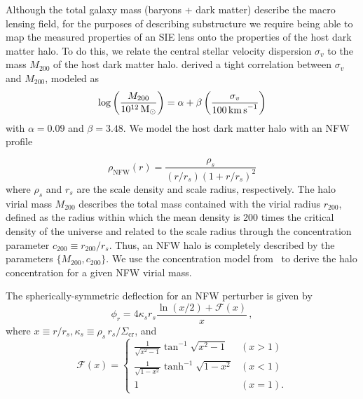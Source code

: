 \documentclass[twocolumn]{aastex63}
\begin{document}
Although the total galaxy mass (baryons + dark matter) describe the macro lensing field, for the purposes of describing substructure we require being able to map the measured properties of an SIE lens onto the properties of the host dark matter halo. To do this, we relate the central stellar velocity dispersion $\sigma_v$ to the mass $M_{200}$ of the host dark matter halo. \citet{2018ApJ...859...96Z} derived a tight correlation between $\sigma_v$ and $M_{200}$, modeled as
\begin{equation}
\log\left(\frac{M_{200}}{10^{12}\,\Msun}\right) = \alpha + \beta\left(\frac{\sigma_v}{100\,\kmps}\right)
\label{eq:sigma_v_M_200_relation}
\end{equation}
with $\alpha = 0.09$ and $\beta = 3.48$.
We model the host dark matter halo with an NFW profile~\citep{1996ApJ...462..563N,1997ApJ...490..493N}

\begin{equation}
\rho_\mathrm{NFW}(r)=\frac{\rho_{s}}{\left(r / r_{s}\right)\left(1+r / r_{s}\right)^{2}}
\label{eq:rhoNFW}
\end{equation}
where $\rho_s$ and $r_s$ are the scale density and scale radius, respectively. The halo virial mass $M_{200}$ describes the total mass contained with the virial radius $r_{200}$, defined as the radius within which the mean density is 200 times the critical density of the universe and related to the scale radius through the concentration parameter $c_{200} \equiv r_{200}/r_s$. Thus, an NFW halo is completely described by the parameters $\{M_{200}, c_{200}\}$. We use the concentration model from~\citet{2014MNRAS.442.2271S} to derive the halo concentration for a given NFW virial mass.

The spherically-symmetric deflection for an NFW perturber is given by~\citep{2001astro.ph..2341K}
\begin{equation}
\phi_{r}=4 \kappa_{s} r_{s} \frac{\ln (x / 2)+\mathcal{F}(x)}{x} \,,
\label{eq:nfw_deflection}
\end{equation}
where $x \equiv r/r_s, \kappa_s\equiv \rho_s\,r_s/\Sigma_\mathrm{cr}$, and
\begin{equation}
\mathcal{F}(x)=\left\{\begin{array}{ll}{\frac{1}{\sqrt{x^{2}-1}} \tan ^{-1} \sqrt{x^{2}-1}} & {(x>1)} \\ {\frac{1}{\sqrt{1-x^{2}}} \tanh ^{-1} \sqrt{1-x^{2}}} & {(x<1)} \\ {1} & {(x=1).}\end{array}\right.
\label{eq:Fx}
\end{equation}
\end{document}
